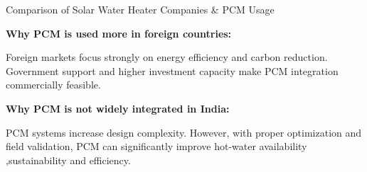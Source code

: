 \documentclass[aspectratio=169, 11pt]{beamer}
\begin{document}
\begin{frame}{Comparison of Solar Water Heater Companies \& PCM Usage}

\small

\begin{table}[h]
\centering
\renewcommand{\arraystretch}{1.1}

\end{table}

\vspace{0.1cm}

\textbf{Why PCM is used more in foreign countries:}

Foreign markets focus strongly on energy efficiency and carbon reduction. Government support and higher investment capacity make PCM integration commercially feasible.

\vspace{0.1cm}

\textbf{Why PCM is not widely integrated in India:}

PCM systems increase design complexity. However, with proper optimization and field validation, PCM can significantly improve hot-water availability ,sustainability and efficiency.

\end{frame}
\end{document}
